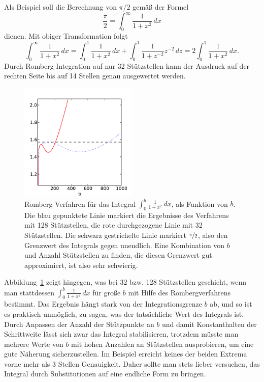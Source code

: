Als Beispiel soll die Berechnung von $\pi/2$ gemäß der Formel
\begin{equation}
  \frac{\pi}{2} = \int_0^{\infty} \frac{1}{1+x^2}\, dx
\end{equation}
dienen. Mit obiger Transformation folgt
\begin{equation}
  \int_0^{\infty} \frac{1}{1+x^2}\, dx
  = \int_0^1 \frac{1}{1+x^2}\, dx +  \int_0^1 \frac{1}{1+z^{-2}}z^{-2}\, dz
  = 2\int_0^1 \frac{1}{1+x^2}\, dx.
\end{equation}
Durch Romberg-Integration auf nur 32 Stützstellen kann der Ausdruck
auf der rechten Seite bis auf 14 Stellen genau ausgewertet
werden.

\begin{figure}
  \centering
  \includegraphics[width=0.5\textwidth]{plots/inf_int}
  \caption{Romberg-Verfahren für das Integral $\int_0^{b}
    \frac{1}{1+x^2}\, dx$, als Funktion von $b$. Die blau gepunktete
    Linie markiert die Ergebnisse des Verfahrens mit 128 Stützstellen,
    die rote durchgezogene Linie mit 32 Stützstellen. Die schwarz
    gestrichelte Linie markiert $\nicefrac{\pi}{2}$, also den
    Grenzwert des Integrals gegen unendlich. Eine Kombination von $b$
    und Anzahl Stützstellen zu finden, die diesen Grenzwert gut
    approximiert, ist also sehr schwierig.}
  \label{fig:inf_int}
\end{figure}

Abbildung~\ref{fig:inf_int} zeigt hingegen, was bei 32
bzw. 128 Stützstellen geschieht, wenn man stattdessen $\int_0^b
\frac{1}{1+x^2}\, dx$ für große $b$ mit Hilfe des Rombergverfahrens
bestimmt. Das Ergebnis hängt stark von der Integrationsgrenze $b$ ab,
und so ist es praktisch unmöglich, zu sagen, was der tatsächliche Wert
des Integrals ist. Durch Anpassen der Anzahl der Stützpunkte an $b$
und damit Konstanthalten der Schrittweite lässt sich zwar das Integral
stabilisieren, trotzdem müsste man mehrere Werte von $b$ mit hohen
Anzahlen an Stützstellen ausprobieren, um eine gute Näherung
sicherzustellen. Im Beispiel erreicht keines der beiden Extrema vorne
mehr als 3 Stellen Genauigkeit. Daher sollte man stets lieber
versuchen, das Integral durch Substitutionen auf eine endliche Form zu
bringen.


